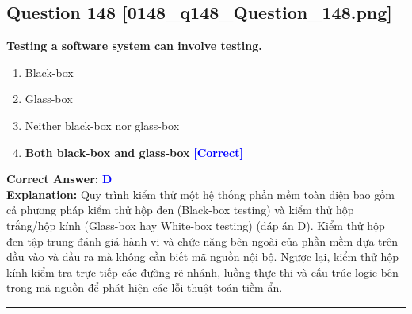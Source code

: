 \documentclass[11pt,a4paper]{article}
\begin{document}
\begin{minipage}{\textwidth}
\subsection*{Question 148 \quad \footnotesize{[0148\_q148\_Question\_148.png]}}
\noindent \textbf{Testing a software system can involve testing.}

\begin{enumerate}[label=\Alph*.]
    \item Black-box
    \item Glass-box
    \item Neither black-box nor glass-box
    \item \textbf{Both black-box and glass-box} \hfill \textcolor{blue}{\textbf{[Correct]}}
\end{enumerate}

\noindent \textbf{Correct Answer:} \textcolor{blue}{\textbf{D}} \\[2pt]
\noindent \textbf{Explanation:} Quy trình kiểm thử một hệ thống phần mềm toàn diện bao gồm cả phương pháp kiểm thử hộp đen (Black-box testing) và kiểm thử hộp trắng/hộp kính (Glass-box hay White-box testing) (đáp án D). Kiểm thử hộp đen tập trung đánh giá hành vi và chức năng bên ngoài của phần mềm dựa trên đầu vào và đầu ra mà không cần biết mã nguồn nội bộ. Ngược lại, kiểm thử hộp kính kiểm tra trực tiếp các đường rẽ nhánh, luồng thực thi và cấu trúc logic bên trong mã nguồn để phát hiện các lỗi thuật toán tiềm ẩn.

\par\vspace{0.3cm}
\hrule
\vspace{0.3cm}
\end{minipage}
\end{document}
